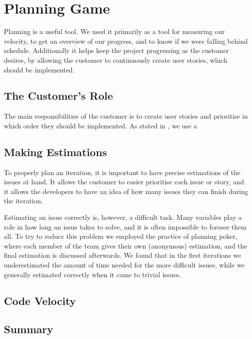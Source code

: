 \section{Planning Game}
Planning is a useful tool.
We used it primarily as a tool for measuring our velocity, to get an overview of our progress, and to know if we were falling behind schedule.
Additionally it helps keep the project progressing as the customer desires, by allowing the customer to continuously create user stories, which should be implemented.

\subsection{The Customer's Role}
The main responsibilities of the customer is to create user stories and prioritise in which order they should be implemented.
As stated in \Cref{}, we use a 

\subsection{Making Estimations}
To properly plan an iteration, it is important to have precise estimations of the issues at hand.
It allows the customer to easier prioritise each issue or story, and it allows the developers to have an idea of how many issues they can finish during the iteration.

Estimating an issue correctly is, however, a difficult task.
Many variables play a role in how long an issue takes to solve, and it is often impossible to foresee them all.
To try to reduce this problem we employed the practice of planning poker, where each member of the team gives their own (anonymous) estimation, and the final estimation is discussed afterwards.
We found that in the first iterations we underestimated the amount of time needed for the more difficult issues, while we generally estimated correctly when it came to trivial issues.

\subsection{Code Velocity}

\subsection{Summary}
